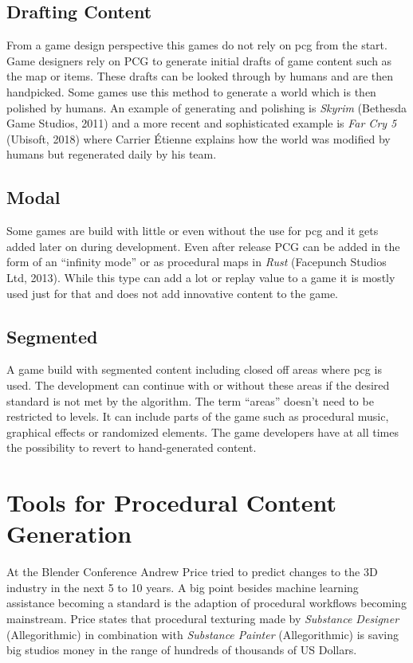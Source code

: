 \documentclass[10pt,a4paper]{article}
\begin{document}
\subsection{Drafting Content}
\begin{multicols}{2} From a game design perspective this games do not rely on \gls{pcg} from the start. Game designers rely on PCG to generate initial drafts of game content such as the map or items. These drafts can be looked through by humans and are then handpicked. Some games use this method to generate a world which is then polished by humans. An example of generating and polishing is \textit{Skyrim} (Bethesda Game Studios, 2011) and a more recent and sophisticated example is \textit{Far Cry 5} (Ubisoft, 2018) where Carrier Étienne explains how the world was modified by humans but regenerated daily by his team\cite{Carrier2018}.
\end{multicols}
\subsection{Modal}
\begin{multicols}{2} Some games are build with little or even without the use for \gls{pcg} and it gets added later on during development. Even after release PCG can be added in the form of an “infinity mode” or as procedural maps in \textit{Rust} (Facepunch Studios Ltd, 2013). While this type can add a lot or replay value to a game it is mostly used just for that and does not add innovative content to the game.
\end{multicols}
\subsection{Segmented}
\begin{multicols}{2} A game build with segmented content including closed off areas where \gls{pcg} is used. The development can continue with or without these areas if the desired standard is not met by the algorithm. The term “areas” doesn’t need to be restricted to levels. It can include parts of the game such as procedural music, graphical effects or randomized elements. The game developers have at all times the possibility to revert to hand-generated content.
\end{multicols}
\section{Tools for Procedural Content Generation}
\begin{multicols}{2}
At the Blender Conference Andrew Price tried to predict changes to the 3D industry in the next 5 to 10 years. A big point besides machine learning assistance becoming a standard is the adaption of procedural workflows becoming mainstream\cite{Price2018}. Price states that procedural texturing made by \textit{Substance Designer} (Allegorithmic) in combination with \textit{Substance Painter} (Allegorithmic) is saving big studios money in the range of hundreds of thousands of US Dollars.
\end{multicols}
\end{document}
